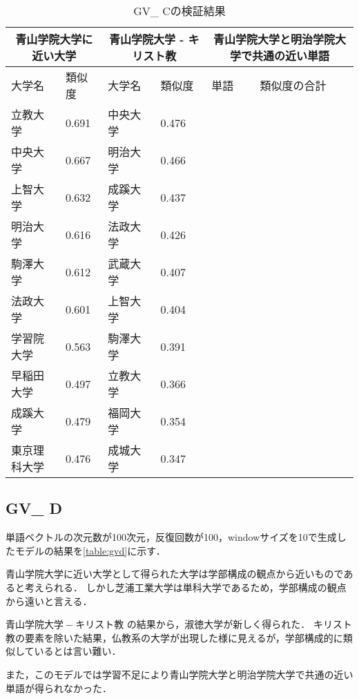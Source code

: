 \begin{table}[H]
\caption{GV\_ Cの検証結果}
\centering
\footnotesize
\begin{tabular}{ll|ll|ll}
\hline
\multicolumn{2}{c}{青山学院大学に近い大学} & \multicolumn{2}{c}{青山学院大学 - キリスト教} & \multicolumn{2}{c}{青山学院大学と明治学院大学で共通の近い単語}
\\ \hline
大学名 & 類似度 & 大学名 & 類似度 & 単語 & 類似度の合計
\\ \hline \hline
立教大学 & 0.691 & 中央大学 & 0.476 & & \\
中央大学 & 0.667 & 明治大学 & 0.466 & & \\
上智大学 & 0.632 & 成蹊大学 & 0.437 & & \\
明治大学 & 0.616 & 法政大学 & 0.426 & & \\
駒澤大学 & 0.612 & 武蔵大学 & 0.407 & & \\
法政大学 & 0.601 & 上智大学 & 0.404 & & \\
学習院大学 & 0.563 & 駒澤大学 & 0.391 & & \\
早稲田大学 & 0.497 & 立教大学 & 0.366 & & \\
成蹊大学 & 0.479 & 福岡大学 & 0.354 & & \\
東京理科大学 & 0.476 & 成城大学 & 0.347 & & \\ \hline
\end{tabular}
\label{table:gvc}
\end{table}

\subsection{GV\_ D}
単語ベクトルの次元数が100次元，反復回数が100，windowサイズを10で生成したモデルの結果を\ref{table:gvd}に示す．

青山学院大学に近い大学として得られた大学は学部構成の観点から近いものであると考えられる．
しかし芝浦工業大学は単科大学であるため，学部構成の観点から遠いと言える．

$ 青山学院大学 - キリスト教 $ の結果から，淑徳大学が新しく得られた．
キリスト教の要素を除いた結果，仏教系の大学が出現した様に見えるが，学部構成的に類似しているとは言い難い．

また，このモデルでは学習不足により青山学院大学と明治学院大学で共通の近い単語が得られなかった．

